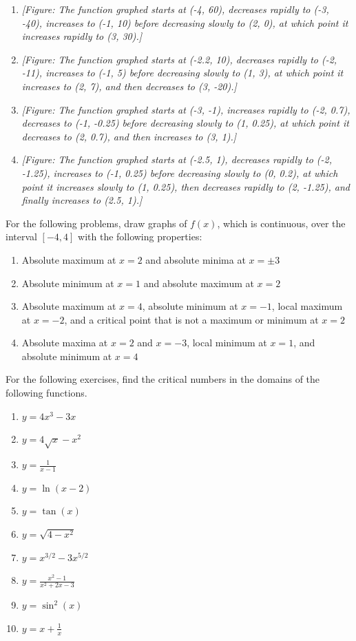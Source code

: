 \documentclass{exercises}
\begin{document}
\begin{enumerate}[resume]
\item \textit{[Figure: The function graphed starts at (-4, 60), decreases rapidly to (-3, -40), increases to (-1, 10) before decreasing slowly to (2, 0), at which point it increases rapidly to (3, 30).]}
\item \textit{[Figure: The function graphed starts at (-2.2, 10), decreases rapidly to (-2, -11), increases to (-1, 5) before decreasing slowly to (1, 3), at which point it increases to (2, 7), and then decreases to (3, -20).]}
\item \textit{[Figure: The function graphed starts at (-3, -1), increases rapidly to (-2, 0.7), decreases to (-1, -0.25) before decreasing slowly to (1, 0.25), at which point it decreases to (2, 0.7), and then increases to (3, 1).]}
\item \textit{[Figure: The function graphed starts at (-2.5, 1), decreases rapidly to (-2, -1.25), increases to (-1, 0.25) before decreasing slowly to (0, 0.2), at which point it increases slowly to (1, 0.25), then decreases rapidly to (2, -1.25), and finally increases to (2.5, 1).]}
\end{enumerate}

For the following problems, draw graphs of $f(x)$, which is continuous, over the interval $[-4,4]$ with the following properties:

\begin{enumerate}[resume]
\item Absolute maximum at $x=2$ and absolute minima at $x=\pm3$
\item Absolute minimum at $x=1$ and absolute maximum at $x=2$
\item Absolute maximum at $x=4$, absolute minimum at $x=-1$, local maximum at $x=-2$, and a critical point that is not a maximum or minimum at $x=2$
\item Absolute maxima at $x=2$ and $x=-3$, local minimum at $x=1$, and absolute minimum at $x=4$
\end{enumerate}

For the following exercises, find the critical numbers in the domains of the following functions.

\begin{enumerate}[resume]
\item $y=4x^{3}-3x$
\item $y=4\sqrt{x}-x^{2}$
\item $y=\frac{1}{x-1}$
\item $y=\ln(x-2)$
\item $y=\tan(x)$
\item $y=\sqrt{4-x^{2}}$
\item $y=x^{3/2}-3x^{5/2}$
\item $y=\frac{x^{2}-1}{x^{2}+2x-3}$
\item $y=\sin^{2}(x)$
\item $y=x+\frac{1}{x}$
\end{enumerate}
\end{document}
